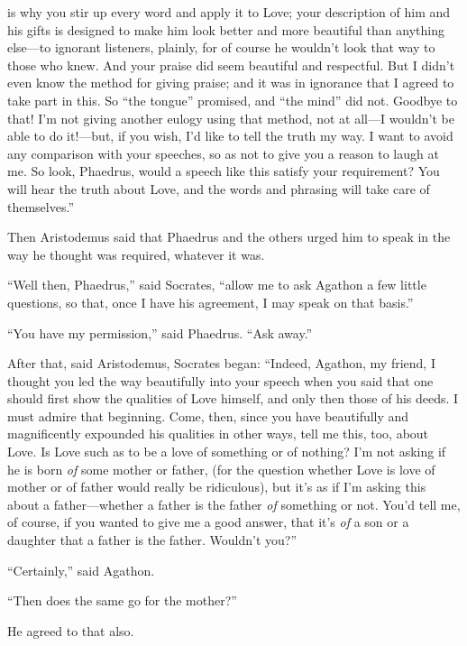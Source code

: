 is why you stir up every word and apply it to Love; your description of
him and  his gifts is designed to make him look better
and more beautiful than anything else---to ignorant listeners, plainly,
for of course he wouldn’t look that way to those who knew. And your
praise did seem beautiful and respectful. But I didn’t even know the
method for giving praise; and it was in ignorance that I agreed to take
part in this. So “the tongue” promised, and “the mind” did
not. Goodbye to that!
I’m not giving another eulogy using that method, not at all---I wouldn’t
be able to do  it!---but, if you wish, I’d like to tell the truth
my way. I want to avoid any comparison with your speeches, so as not to
give you a reason to laugh at me. So look, Phaedrus, would a speech like
this satisfy your requirement? You will hear the truth about Love, and
the words and phrasing will take care of themselves.”

Then Aristodemus said that Phaedrus and the others urged him to speak in
the way he thought was required, whatever it was.

“Well then, Phaedrus,” said Socrates, “allow me to ask Agathon a few
 little questions, so that, once I have his agreement, I may
speak on that basis.”

“You have my permission,” said Phaedrus. “Ask away.”

After that, said Aristodemus, Socrates began: “Indeed, Agathon, my
friend, I thought you led the way beautifully into your speech when you
said that one should first show the qualities of Love himself, and only
then those of his deeds. I must admire that beginning. Come, then, since
 you have beautifully and magnificently expounded his qualities
in other ways, tell me this, too, about Love. Is Love such as to be a
love of something or of nothing? I’m not asking if he is born {\em of}
some mother or father, (for the question whether Love is love of mother
or of father would really be ridiculous), but it’s as if I’m asking this
about a father---whether a father is the father {\em of} something or
not. You’d tell me, of course, if you wanted to give me a good answer,
that it’s {\em of} a son or a daughter that a father is the father.
Wouldn’t you?”

“Certainly,” said Agathon.

“Then does the same go for the mother?”

 He agreed to that also.

